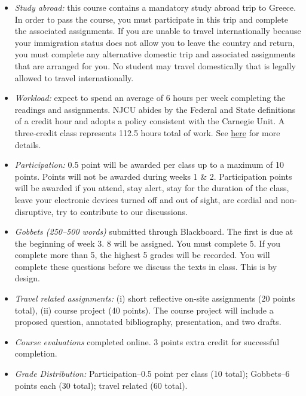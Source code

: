 \documentclass[article,oneside]{memoir}
\begin{document}
\begin{itemize}

\item \textit{Study abroad:} this course contains a mandatory study abroad trip to Greece. In order to pass the course, you must participate in this trip and complete the associated assignments. If you are unable to travel internationally because your immigration status does not allow you to leave the country and return, you must complete any alternative domestic trip and associated assignments that are arranged for you. No student may travel domestically that is legally allowed to travel internationally.  

\item \textit{Workload:} expect to spend an average of 6 hours per week completing the readings and assignments. NJCU abides by the Federal and State definitions of a credit hour and adopts a policy consistent with the Carnegie Unit. A three-credit class represents 112.5 hours total of work. See \href{http://scottoconnor.org/resources/Credit.pdf}{here} for more details.

\item \textit{Participation:} 0.5 point will be awarded per class up to a maximum of 10 points. Points will not be awarded during weeks 1 \& 2. Participation points will be awarded if you attend, stay alert, stay for the duration of the class, leave your electronic devices turned off and out of sight, are cordial and non-disruptive, try to contribute to our discussions. 


\item \textit{Gobbets (250--500 words)} submitted through Blackboard. The first is due at the beginning of week 3. 8 will be assigned. You must complete 5. If you complete more than 5, the highest 5 grades will be recorded. You will complete these questions before we discuss the texts in class. This is by design. 

\item \textit{Travel related assignments:} (i) short reflective on-site assignments (20 points total), (ii) course project (40 points). The course project will include a proposed question, annotated bibliography, presentation, and two drafts. 

\item \textit{Course evaluations} completed online. 3 points extra credit for successful completion.





\item \textit{Grade Distribution:} Participation--0.5 point per class (10 total); Gobbets--6 points each (30 total); travel related  (60 total).


\end{itemize}
\end{document}
